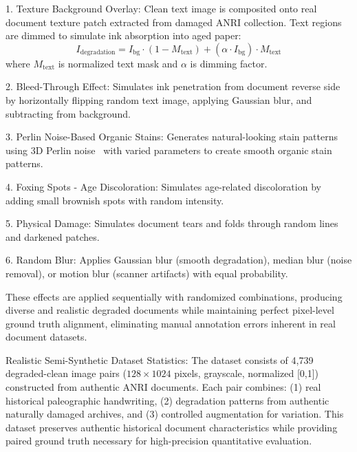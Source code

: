 \documentclass[journal]{IEEEtran}
\begin{document}
1. Texture Background Overlay:
Clean text image is composited onto real document texture patch extracted from damaged ANRI collection. Text regions are dimmed to simulate ink absorption into aged paper:
\begin{equation}
I_{\text{degradation}} = I_{\text{bg}} \cdot (1 - M_{\text{text}}) + (\alpha \cdot I_{\text{bg}}) \cdot M_{\text{text}}
\end{equation}
where $M_{\text{text}}$ is normalized text mask and $\alpha$ is dimming factor.

2. Bleed-Through Effect:
Simulates ink penetration from document reverse side by horizontally flipping random text image, applying Gaussian blur, and subtracting from background.

3. Perlin Noise-Based Organic Stains:
Generates natural-looking stain patterns using 3D Perlin noise~\cite{perlin1985image} with varied parameters to create smooth organic stain patterns.

4. Foxing Spots - Age Discoloration:
Simulates age-related discoloration by adding small brownish spots with random intensity.

5. Physical Damage:
Simulates document tears and folds through random lines and darkened patches.

6. Random Blur:
Applies Gaussian blur (smooth degradation), median blur (noise removal), or motion blur (scanner artifacts) with equal probability.

These effects are applied sequentially with randomized combinations, producing diverse and realistic degraded documents while maintaining perfect pixel-level ground truth alignment, eliminating manual annotation errors inherent in real document datasets.

Realistic Semi-Synthetic Dataset Statistics: The dataset consists of 4,739 degraded-clean image pairs ($128 \times 1024$ pixels, grayscale, normalized [0,1]) constructed from authentic ANRI documents. Each pair combines: (1) real historical paleographic handwriting, (2) degradation patterns from authentic naturally damaged archives, and (3) controlled augmentation for variation. This dataset preserves authentic historical document characteristics while providing paired ground truth necessary for high-precision quantitative evaluation.
\end{document}
